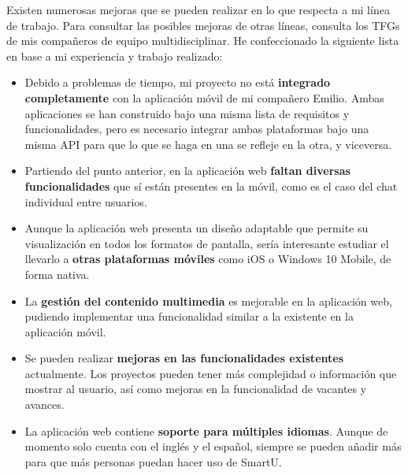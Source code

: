 Existen numerosas mejoras que se pueden realizar en lo que respecta a mi línea de trabajo. Para consultar las posibles mejoras de otras líneas, consulta los TFGs de mis compañeros de equipo multidisciplinar. He confeccionado la siguiente lista en base a mi experiencia y trabajo realizado:

\begin{itemize}
    \item Debido a problemas de tiempo, mi proyecto no está \textbf{integrado completamente} con la aplicación móvil de mi compañero Emilio. Ambas aplicaciones se han construido bajo una misma lista de requisitos y funcionalidades, pero es necesario integrar ambas plataformas bajo una misma API para que lo que se haga en una se refleje en la otra, y viceversa.
    \item Partiendo del punto anterior, en la aplicación web \textbf{faltan diversas funcionalidades} que sí están presentes en la móvil, como es el caso del chat individual entre usuarios.
    \item Aunque la aplicación web presenta un diseño adaptable que permite su visualización en todos los formatos de pantalla, sería interesante estudiar el llevarlo a \textbf{otras plataformas móviles} como iOS o Windows 10 Mobile, de forma nativa.
    \item La \textbf{gestión del contenido multimedia} es mejorable en la aplicación web, pudiendo implementar una funcionalidad similar a la existente en la aplicación móvil.
    \item Se pueden realizar \textbf{mejoras en las funcionalidades existentes} actualmente. Los proyectos pueden tener más complejidad o información que mostrar al usuario, así como mejoras en la funcionalidad de vacantes y avances.
    \item La aplicación web contiene \textbf{soporte para múltiples idiomas}. Aunque de momento solo cuenta con el inglés y el español, siempre se pueden añadir más para que más personas puedan hacer uso de SmartU.
\end{itemize}
